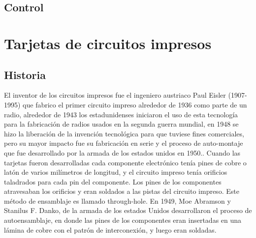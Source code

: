 \documentclass[a4paper,12pt,twoside]{proyectotanquesecci}
\begin{document}
\newpage




\section{Control}


\newpage







\appendix

\chapter{Tarjetas de circuitos impresos}

\section{Historia}

El inventor de los circuitos impresos fue el ingeniero austriaco Paul Eisler (1907-1995) que fabrico el primer circuito impreso alrededor de 1936 como parte de un radio, alrededor  de 1943 los estadunidenses iniciaron el uso de esta tecnología para la fabricación de radios  usados en la segunda guerra mundial, en 1948 se hizo la liberación de la invención tecnológica para que tuviese fines comerciales, pero su mayor impacto fue su fabricación en serie y el proceso de auto-montaje  que fue desarrollado por la  armada de los estados unidos en  1950..
Cuando las tarjetas fueron desarrolladas cada componente electrónico tenía pines de cobre o latón de varios milímetros de longitud, y el circuito impreso tenía orificios taladrados para cada pin del componente. Los pines de los componentes atravesaban los orificios y eran soldados a las pistas del circuito impreso. Este método de ensamblaje es llamado through-hole.
En 1949, Moe Abramson y Stanilus F. Danko, de la armada de  los estados Unidos desarrollaron el proceso de autoensamblaje, en donde las pines de los componentes eran insertadas en una lámina de cobre con el patrón de interconexión, y luego eran soldadas.
\end{document}
